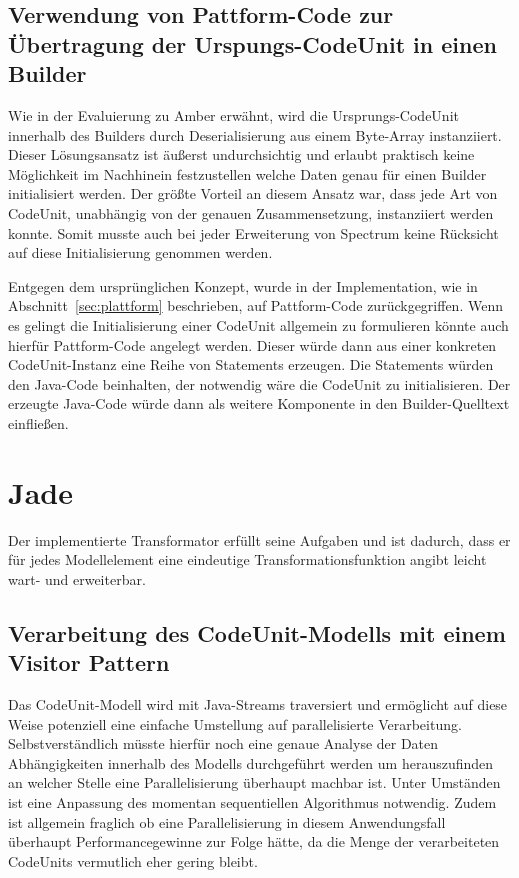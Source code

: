 \documentclass[12pt,oneside,a4paper,parskip]{scrbook}
\begin{document}
\subsection{Verwendung von Pattform-Code zur Übertragung der Urspungs-CodeUnit in einen Builder}

Wie in der Evaluierung zu Amber erwähnt, wird die Ursprungs-CodeUnit innerhalb des Builders durch Deserialisierung aus einem Byte-Array instanziiert. Dieser Lösungsansatz ist äußerst undurchsichtig und erlaubt praktisch keine Möglichkeit im Nachhinein festzustellen welche Daten genau für einen Builder initialisiert werden. Der größte Vorteil an diesem Ansatz war, dass jede Art von CodeUnit, unabhängig von der genauen Zusammensetzung, instanziiert werden konnte. Somit musste auch bei jeder Erweiterung von Spectrum keine Rücksicht auf diese Initialisierung genommen werden.

Entgegen dem ursprünglichen Konzept, wurde in der Implementation, wie in Abschnitt~\ref{sec:plattform} beschrieben, auf Pattform-Code zurückgegriffen. Wenn es gelingt die Initialisierung einer CodeUnit allgemein zu formulieren könnte auch hierfür Pattform-Code angelegt werden. Dieser würde dann aus einer konkreten CodeUnit-Instanz eine Reihe von Statements erzeugen. Die Statements würden den Java-Code beinhalten, der notwendig wäre die CodeUnit zu initialisieren. Der erzeugte Java-Code würde dann als weitere Komponente in den Builder-Quelltext einfließen.

\section{Jade}

Der implementierte Transformator erfüllt seine Aufgaben und ist dadurch, dass er für jedes Modellelement eine eindeutige Transformationsfunktion angibt leicht wart- und erweiterbar. 

\subsection{Verarbeitung des CodeUnit-Modells mit einem Visitor Pattern}

Das CodeUnit-Modell wird mit Java-Streams traversiert und ermöglicht auf diese Weise potenziell eine einfache Umstellung auf parallelisierte Verarbeitung. Selbstverständlich müsste hierfür noch eine genaue Analyse der Daten Abhängigkeiten innerhalb des Modells durchgeführt werden um herauszufinden an welcher Stelle eine Parallelisierung überhaupt machbar ist. Unter Umständen ist eine Anpassung des momentan sequentiellen Algorithmus notwendig. Zudem ist allgemein fraglich ob eine Parallelisierung in diesem Anwendungsfall überhaupt Performancegewinne zur Folge hätte, da die Menge der verarbeiteten CodeUnits vermutlich eher gering bleibt.
\end{document}
